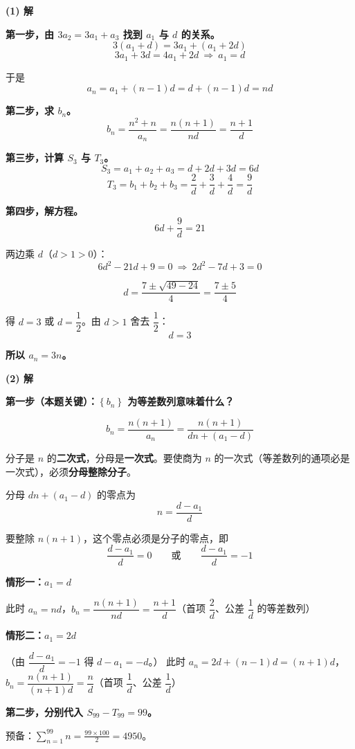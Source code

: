 \par\medskip

\textbf{(1) 解}

\textbf{第一步，由 $3a_2=3a_1+a_3$ 找到 $a_1$ 与 $d$ 的关系。}
\[3\left(a_1+d\right)=3a_1+\left(a_1+2d\right)\]
\[3a_1+3d=4a_1+2d\ \Longrightarrow\ a_1=d\]

于是
\[a_n=a_1+(n-1)d=d+(n-1)d=nd\]

\textbf{第二步，求 $b_n$。}
\[b_n=\frac{n^{2}+n}{a_n}=\frac{n(n+1)}{nd}=\frac{n+1}d\]

\textbf{第三步，计算 $S_3$ 与 $T_3$。}
\[S_3=a_1+a_2+a_3=d+2d+3d=6d\]
\[T_3=b_1+b_2+b_3=\frac2d+\frac3d+\frac4d=\frac9d\]

\textbf{第四步，解方程。}
\[6d+\frac9d=21\]

两边乘 $d$（$d>1>0$）：
\[6d^{2}-21d+9=0\ \Longrightarrow\ 2d^{2}-7d+3=0\]

\[d=\frac{7\pm\sqrt{49-24}}4=\frac{7\pm5}4\]

得 $d=3$ 或 $d=\dfrac12$。由 $d>1$ 舍去 $\dfrac12$：
\[d=3\]

\textbf{所以 $a_n=3n$。}

\par\medskip

\textbf{(2) 解}

\textbf{第一步（本题关键）：$\left\{b_n\right\}$ 为等差数列意味着什么？}

\[b_n=\frac{n(n+1)}{a_n}=\frac{n(n+1)}{dn+\left(a_1-d\right)}\]

分子是 $n$ 的\textbf{二次式}，分母是\textbf{一次式}。要使商为 $n$ 的一次式（等差数列的通项必是一次式），必须\textbf{分母整除分子}。

分母 $dn+\left(a_1-d\right)$ 的零点为
\[n=\frac{d-a_1}d\]

要整除 $n(n+1)$，这个零点必须是分子的零点，即
\[\frac{d-a_1}d=0\qquad\text{或}\qquad\frac{d-a_1}d=-1\]

\textbf{情形一：$a_1=d$}

此时 $a_n=nd$，$b_n=\dfrac{n(n+1)}{nd}=\dfrac{n+1}d$（首项 $\dfrac2d$、公差 $\dfrac1d$ 的等差数列）

\textbf{情形二：$a_1=2d$}

（由 $\dfrac{d-a_1}d=-1$ 得 $d-a_1=-d$。）
此时 $a_n=2d+(n-1)d=(n+1)d$，$b_n=\dfrac{n(n+1)}{(n+1)d}=\dfrac nd$（首项 $\dfrac1d$、公差 $\dfrac1d$）

\textbf{第二步，分别代入 $S_{99}-T_{99}=99$。}

预备：$\displaystyle\sum_{n=1}^{99}n=\frac{99\times100}2=4950$。

